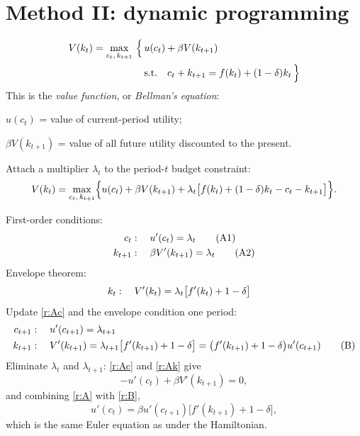 \documentclass[11pt]{article}
\begin{document}
\section{Method II: dynamic programming}

\begin{align*}
  V(k_t)=\max_{c_t,\,k_{t+1}}\ \Bigl\{\, & u(c_t)+\beta V(k_{t+1})\\
  &\text{s.t.}\quad c_t+k_{t+1}=f(k_t)+(1-\delta)k_t \,\Bigr\}
\end{align*}
This is the \emph{value function}, or \emph{Bellman's equation}:
\begin{flatlist}
  \item[(a)] $u(c_t)$ = value of current-period utility;
  \item[(b)] $\beta V(k_{t+1})$ = value of all future utility discounted to the present.
\end{flatlist}

Attach a multiplier $\lambda_t$ to the period-$t$ budget constraint:
\[ V(k_t)=\max_{c_t,\,k_{t+1}}\Bigl\{u(c_t)+\beta V(k_{t+1})
   +\lambda_t\bigl[f(k_t)+(1-\delta)k_t-c_t-k_{t+1}\bigr]\Bigr\}. \]

First-order conditions:
\begin{align}
  c_t &:\quad u'(c_t)=\lambda_t \tag{A1}\label{r:Ac}\\
  k_{t+1} &:\quad \beta V'(k_{t+1})=\lambda_t \tag{A2}\label{r:Ak}
\end{align}
Envelope theorem:
\begin{align}
  k_t &:\quad V'(k_t)=\lambda_t\bigl[f'(k_t)+1-\delta\bigr] \notag
\end{align}
Update \eqref{r:Ac} and the envelope condition one period:
\begin{align}
  c_{t+1} &:\quad u'(c_{t+1})=\lambda_{t+1} \notag\\
  k_{t+1} &:\quad V'(k_{t+1})=\lambda_{t+1}\bigl[f'(k_{t+1})+1-\delta\bigr]
         =\bigl(f'(k_{t+1})+1-\delta\bigr)u'(c_{t+1}) \tag{B}\label{r:B}
\end{align}
Eliminate $\lambda_t$ and $\lambda_{t+1}$: \eqref{r:Ac} and \eqref{r:Ak} give
\begin{equation}
  -u'(c_t)+\beta V'(k_{t+1})=0, \tag{A}\label{r:A}
\end{equation}
and combining \eqref{r:A} with \eqref{r:B},
\[ u'(c_t)=\beta u'(c_{t+1})\bigl[f'(k_{t+1})+1-\delta\bigr], \tag{7} \]
which is the same Euler equation as under the Hamiltonian.
\end{document}
